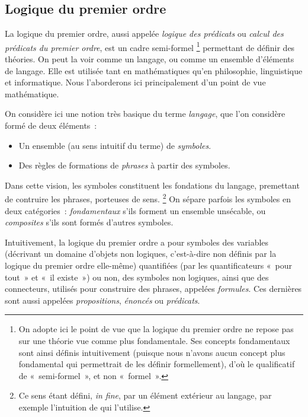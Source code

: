 \subsection{Logique du premier ordre}

La logique du premier ordre, aussi appelée \textit{logique des prédicats} ou \textit{calcul des prédicats du premier ordre}, est un cadre semi-formel%
\footnote{ On adopte ici le point de vue que la logique du premier ordre ne repose pas sur une théorie vue comme plus fondamentale. Ses concepts fondamentaux sont ainsi définis intuitivement (puisque nous n'avons aucun concept plus fondamental qui permettrait de les définir formellement), d'où le qualificatif de « semi-formel », et non « formel ».} 
permettant de définir des théories. 
On peut la voir comme un langage, ou comme un ensemble d'éléments de langage.
Elle est utilisée tant en mathématiques qu'en philosophie, linguistique et informatique. 
Nous l'aborderons ici principalement d'un point de vue mathématique.

On considère ici une notion très basique du terme \textit{langage}, que l'on considère formé de deux éléments : 
\begin{itemize}[nosep]
    \item Un ensemble (au sens intuitif du terme) de \textit{symboles}.
    \item Des règles de formations de \textit{phrases} à partir des symboles.
\end{itemize}
Dans cette vision, les symboles constituent les fondations du langage, premettant de contruire les phrases, porteuses de sens.%
\footnote{ Ce sens étant défini, \textit{in fine}, par un élément extérieur au langage, par exemple l'intuition de qui l'utilise.} 
On sépare parfois les symboles en deux catégories : \textit{fondamentaux} s'ils forment un ensemble unsécable, ou \textit{composites} s'ils sont formés d'autres symboles.

Intuitivement, la logique du premier ordre a pour symboles des variables (décrivant un domaine d'objets non logiques, c'est-à-dire non définis par la logique du premier ordre elle-même) quantifiées (par les quantificateurs « pour tout » et « il existe ») ou non, des symboles non logiques, ainsi que des connecteurs, utilisés pour construire des phrases, appelées \textit{formules}. 
Ces dernières sont aussi appelées \textit{propositions}, \textit{énoncés} ou \textit{prédicats}. 

